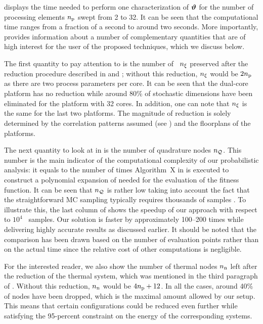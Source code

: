 
 displays the time needed to perform one characterization of $\bm{\vartheta}$ for the number of processing elements ${n_\text{p}}$ swept from 2 to 32.
It can be seen that the computational time ranges from a fraction of a second to around two seconds.
More importantly,  provides information about a number of complementary quantities that are of high interest for the user of the proposed techniques, which we discuss below.

The first quantity to pay attention to is the number of \rvs\ ${n_\xi}$ preserved after the reduction procedure described in  and ; without this reduction, ${n_\xi}$ would be $2 {n_\text{p}}$ as there are two process parameters per core.
It can be seen that the dual-core platform has no reduction while around 80\% of stochastic dimensions have been eliminated for the platform with 32 cores.
In addition, one can note that ${n_\xi}$ is the same for the last two platforms.
The magnitude of reduction is solely determined by the correlation patterns assumed (see ) and the floorplans of the platforms.

The next quantity to look at in  is the number of quadrature nodes ${n_\mathcal{Q}}$.
This number is the main indicator of the computational complexity of our probabilistic analysis: it equals to the number of times Algorithm~X in  is executed to construct a polynomial expansion of  needed for the evaluation of the fitness function.
It can be seen that ${n_\mathcal{Q}}$ is rather low taking into account the fact that the straightforward MC sampling typically requires thousands of samples \cite{ukhov2014, lee2013, xiang2010, juan2012}.
To illustrate this, the last column of  shows the speedup of our approach with respect to $10^4$ \MC\ samples.
Our solution is faster by approximately 100--200 times while delivering highly accurate results as discussed earlier.
It should be noted that the comparison has been drawn based on the number of evaluation points rather than on the actual time since the relative cost of other computations is negligible.

For the interested reader, we also show the number of thermal nodes ${n_\text{n}}$ left after the reduction of the thermal system, which was mentioned in the third paragraph of .
Without this reduction, ${n_\text{n}}$ would be $4 {n_\text{p}} + 12$.
In all the cases, around 40\% of nodes have been dropped, which is the maximal amount allowed by our setup.
This means that certain configurations could be reduced even further while satisfying the 95-percent constraint on the energy of the corresponding systems.

